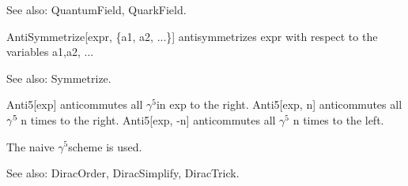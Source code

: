 See also:  QuantumField, QuarkField.



\dispSFoutmath{
\overvar{\psi }{\_}
}



AntiSymmetrize[expr, \{a1, a2, ...\}] antisymmetrizes expr with respect to the variables a1,a2, ... 

See also: Symmetrize.








Anti5[exp] anticommutes all \({{\gamma }^5}\)in exp to the right. Anti5[exp, n] anticommutes all \({{\gamma }^{5\> }}\)n times to the right.
Anti5[exp, -n] anticommutes all \({{\gamma }^5}\) n times to the left.

The naive \({{\gamma }^5}\)scheme is used.

See also:  DiracOrder, DiracSimplify, DiracTrick.










